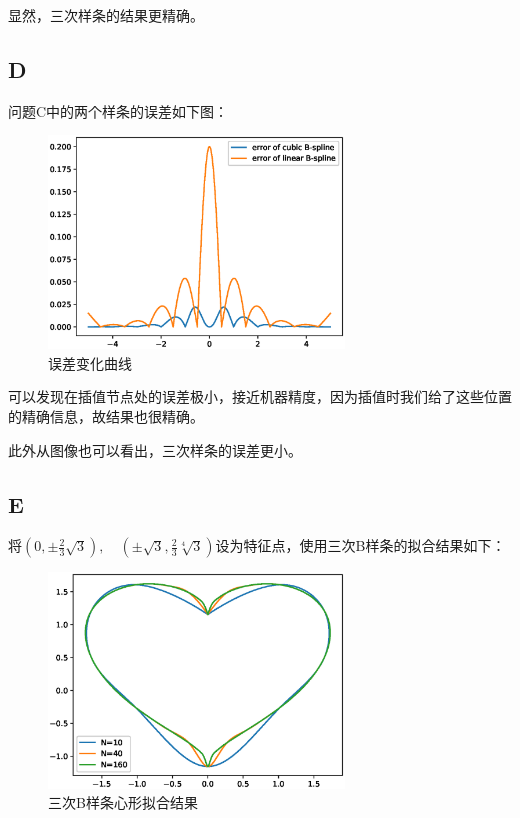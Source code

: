 \documentclass[12]{article}%
\begin{document}
        显然，三次样条的结果更精确。
    \subsection{D}
        问题C中的两个样条的误差如下图：
        \begin{figure}[H]
            \centering
            \includegraphics[width=0.7\textwidth]{../pic/C2.eps}
            \caption{误差变化曲线}
        \end{figure}

        可以发现在插值节点处的误差极小，接近机器精度，因为插值时我们给了这些位置的精确信息，故结果也很精确。

        此外从图像也可以看出，三次样条的误差更小。
    
    \subsection{E}
        将$(0,\pm\frac{2}{3}\sqrt{3}),\quad(\pm\sqrt{3},\frac{2}{3}\sqrt[4]{3})$设为特征点，使用三次B样条的拟合结果如下：
        \begin{figure}[H]
            \centering
            \includegraphics[width=0.7\textwidth]{../pic/E.eps}
            \caption{三次B样条心形拟合结果}
        \end{figure}
\end{document}
